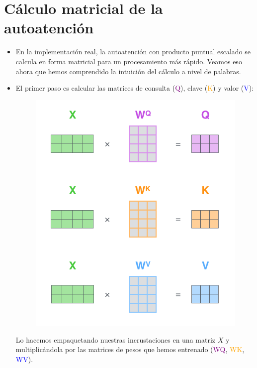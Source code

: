 \section{Cálculo matricial de la autoatención}
\begin{itemize}

\item En la implementación real, la autoatención con producto puntual escalado se calcula en forma matricial para un procesamiento más rápido. Veamos eso ahora que hemos comprendido la intuición del cálculo a nivel de palabras.

\item El primer paso es calcular las matrices de consulta (\textcolor{purple}{Q}), clave (\textcolor{orange}{K}) y valor (\textcolor{blue}{V}):

\begin{figure}[h]
  \centering
  \includegraphics[scale=0.25]{pics/self-attention-matrix-calculation.png}
\end{figure}

Lo hacemos empaquetando nuestras incrustaciones en una matriz $X$ y multiplicándola por las matrices de pesos que hemos entrenado (\textcolor{purple}{WQ}, \textcolor{orange}{WK}, \textcolor{blue}{WV}).


\end{itemize}
